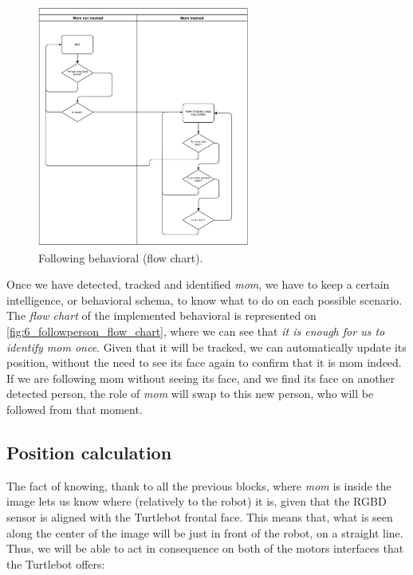 		\begin{figure}
			\centering
			\includegraphics[width=7cm]{images/followperson_flowchart_cropped}
			\caption{Following behavioral (flow chart).}
			\label{fig:6_followperson_flow_chart}
		\end{figure}
		Once we have detected, tracked and identified \emph{mom}, we have to keep a certain intelligence, or behavioral schema, to know what to do on each possible scenario. The \emph{flow chart} of the implemented behavioral is represented on \autoref{fig:6_followperson_flow_chart}, where we can see that \emph{it is enough for us to identify mom once}. Given that it will be tracked, we can automatically update its position,  without the need to see its face again to confirm that it is mom indeed. If we are following mom without seeing its face, and we find its face on another detected person, the role of \emph{mom} will swap to this new person, who will be followed from that moment.\\

	\subsection{Position calculation}
		The fact of knowing, thank to  all the previous blocks, where \emph{mom} is inside the image lets us know where (relatively to the robot) it is, given that the RGBD sensor is aligned with the Turtlebot frontal face. This means that, what is seen along the center of the image will be just in front of the robot, on a straight line. Thus, we will be able to act in consequence on both of the motors interfaces that the Turtlebot offers:
		
